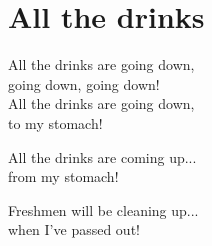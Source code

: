 \section{All the drinks}
All the drinks are going down,\\
going down, going down!\\
All the drinks are going down,\\
to my stomach!

All the drinks are coming up...\\
from my stomach!

Freshmen will be cleaning up...\\
when I've passed out!